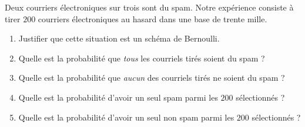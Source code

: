 
\begin{exercice}\label{exoPremiere-0083}

    Deux courriers électroniques sur trois sont du spam. Notre expérience consiste à tirer $200$ courriers électroniques au hasard dans une base de trente mille.
    \begin{enumerate}
        \item
            Justifier que cette situation est un schéma de Bernoulli.
        \item
            Quelle est la probabilité que \emph{tous} les courriels tirés soient du spam ?
        \item
            Quelle est la probabilité que \emph{aucun} des courriels tirés ne soient du spam ?
        \item
            Quelle est la probabilité d'avoir un seul spam parmi les \( 200\) sélectionnés ?
        \item
            Quelle est la probabilité d'avoir un seul non spam parmi les \( 200\) sélectionnés ?
    \end{enumerate}

\end{exercice}

